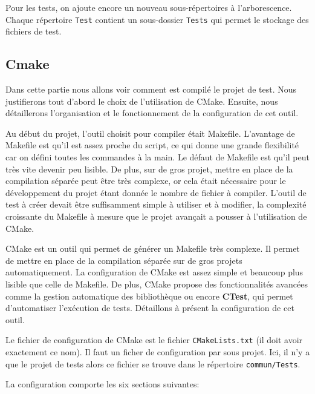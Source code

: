 \documentclass[a4paper]{article}
\begin{document}
Pour les tests, on ajoute encore un nouveau sous-répertoires à l'arborescence.
Chaque répertoire \verb|Test| contient un sous-dossier \verb|Tests| qui permet le
stockage des fichiers de test.

\subsection{Cmake}
\label{cmake}

Dans cette partie nous allons voir comment est compilé le projet de test. Nous
justifierons tout d'abord le choix de l'utilisation de CMake. Ensuite, nous
détaillerons l'organisation et le fonctionnement de la configuration de cet
outil.

Au début du projet, l'outil choisit pour compiler était Makefile. L'avantage de
Makefile est qu'il est assez proche du script, ce qui donne une grande
flexibilité car on défini toutes les commandes à la main. Le défaut de Makefile
est qu'il peut très vite devenir peu lisible. De plus, sur de gros projet, mettre
en place de la compilation séparée peut être très complexe, or cela était
nécessaire pour le développement du projet étant donnée le nombre de fichier à
compiler. L'outil de test à créer devait être suffisamment simple à utiliser et à
modifier, la complexité croissante du Makefile à mesure que le projet avançait a
pousser à l'utilisation de CMake.

CMake est un outil qui permet de générer un Makefile très complexe. Il permet de
mettre en place de la compilation séparée sur de gros projets automatiquement.
La configuration de CMake est assez simple et beaucoup plus lisible que celle de
Makefile. De plus, CMake propose des fonctionnalités avancées comme la gestion
automatique des bibliothèque ou encore \textbf{CTest}, qui permet d'automatiser
l'exécution de tests. Détaillons à présent la configuration de cet outil.

Le fichier de configuration de CMake est le fichier \verb|CMakeLists.txt|
(il doit avoir exactement ce nom). Il faut un ficher de configuration par sous
projet. Ici, il n'y a que le projet de tests alors ce fichier se trouve dans le
répertoire \verb|commun/Tests|.

La configuration comporte les six sections suivantes:
\end{document}
